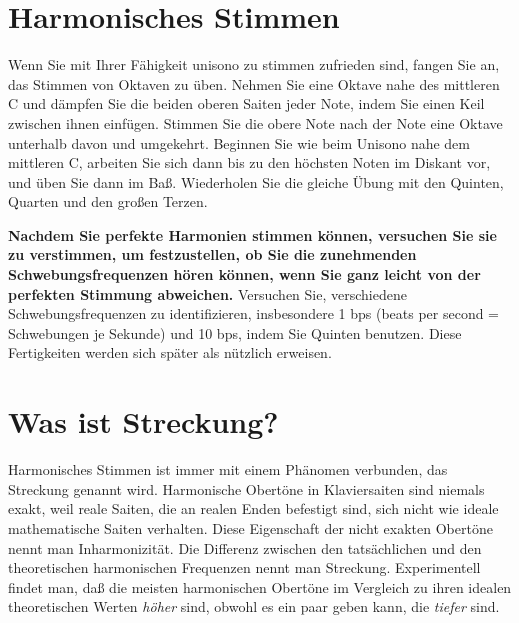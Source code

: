 \hypertarget{c2_5j}{}
\section{Harmonisches Stimmen}
\label{c2_5_harm}

Wenn Sie mit Ihrer Fähigkeit unisono zu stimmen zufrieden sind, fangen Sie an, das Stimmen von Oktaven zu üben.
Nehmen Sie eine Oktave nahe des mittleren C und dämpfen Sie die beiden oberen Saiten jeder Note, indem Sie einen Keil zwischen ihnen einfügen.
Stimmen Sie die obere Note nach der Note eine Oktave unterhalb davon und umgekehrt.
Beginnen Sie wie beim Unisono nahe dem mittleren C, arbeiten Sie sich dann bis zu den höchsten Noten im Diskant vor, und üben Sie dann im Baß.
Wiederholen Sie die gleiche Übung mit den Quinten, Quarten und den großen Terzen.

\textbf{Nachdem Sie perfekte Harmonien stimmen können, versuchen Sie sie zu verstimmen, um festzustellen, ob Sie die zunehmenden Schwebungsfrequenzen hören können, wenn Sie ganz leicht von der perfekten Stimmung abweichen.}
Versuchen Sie, verschiedene Schwebungsfrequenzen zu identifizieren, insbesondere 1 bps (beats per second = Schwebungen je Sekunde) und 10 bps, indem Sie Quinten benutzen.
Diese Fertigkeiten werden sich später als nützlich erweisen.
 

\hypertarget{c2_5k}{}
\section{Was ist Streckung?}
\label{c2_5_stre}

Harmonisches Stimmen ist immer mit einem Phänomen verbunden, das Streckung genannt wird.
Harmonische Obertöne in Klaviersaiten sind niemals exakt, weil reale Saiten, die an realen Enden befestigt sind, sich nicht wie ideale mathematische Saiten verhalten.
Diese Eigenschaft der nicht exakten Obertöne nennt man Inharmonizität.
Die Differenz zwischen den tatsächlichen und den theoretischen harmonischen Frequenzen nennt man Streckung.
Experimentell findet man, daß die meisten harmonischen Obertöne im Vergleich zu ihren idealen theoretischen Werten \textit{höher} sind, obwohl es ein paar geben kann, die \textit{tiefer} sind.

